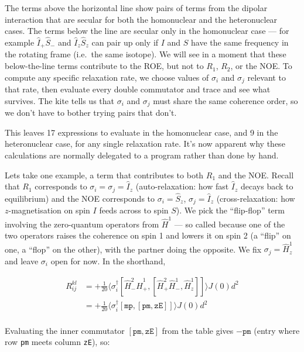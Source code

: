\documentclass[notitlepage,11pt]{article}
\begin{document}
The terms above the horizontal line show pairs of terms from the dipolar interaction that are secular for both the homonuclear and the heteronuclear cases. The terms below the line are secular only in the homonuclear case — for example $\hat{I}_+\hat{S}_-$ and $\hat{I}_z\hat{S}_z$ can pair up only if $I$ and $S$ have the same frequency in the rotating frame (i.e.\ the same isotope). We will see in a moment that these below-the-line terms contribute to the ROE, but not to $R_1$, $R_2$, or the NOE. To compute any specific relaxation rate, we choose values of $\sigma_i$ and $\sigma_j$ relevant to that rate, then evaluate every double commutator and trace and see what survives. The kite tells us that $\sigma_i$ and $\sigma_j$ must share the same coherence order, so we don't have to bother trying pairs that don't.

This leaves 17 expressions to evaluate in the homonuclear case, and 9 in the heteronuclear case, for any single relaxation rate. It's now apparent why these calculations are normally delegated to a program rather than done by hand.

Lets take one example, a term that contributes to both $R_1$ and the NOE. Recall that $R_1$ corresponds to $\sigma_i=\sigma_j=\hat{I}_z$ (auto-relaxation: how fast $\hat{I}_z$ decays back to equilibrium) and the NOE corresponds to $\sigma_i=\hat{S}_z$, $\sigma_j=\hat{I}_z$ (cross-relaxation: how $z$-magnetisation on spin $I$ feeds across to spin $S$). We pick the ``flip-flop'' term involving the zero-quantum operators from $\hat{H}^1$ — so called because one of the two operators raises the coherence on spin 1 and lowers it on spin 2 (a ``flip'' on one, a ``flop'' on the other), with the partner doing the opposite. We fix $\sigma_j=\hat{H}^1_z$ and leave $\sigma_i$ open for now. In the shorthand,

\begin{equation}
\begin{array}{rl}
  R_{ij}^{kl}&= +\frac{1}{20}\langle \sigma_i^\dagger [\hat{H}^2_- \hat{H}^1_+ ,[\hat{H}^2_+ \hat{H}^1_- ,\hat{H}^1_z]] \rangle J\left(0\right)d^2 \\
  &= +\frac{1}{20}\langle \sigma_i^\dagger [\texttt{mp},[\texttt{pm} ,\texttt{zE}]] \rangle J\left(0\right)d^2 \\
\end{array}
\end{equation}

Evaluating the inner commutator $[\texttt{pm},\texttt{zE}]$ from the table gives $-\texttt{pm}$ (entry where row \texttt{pm} meets column \texttt{zE}), so:
\end{document}
